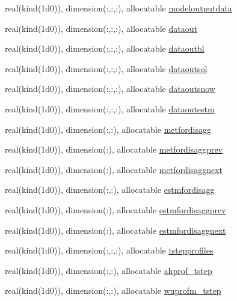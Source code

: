 \begin{DoxyCompactItemize}
\item 
real(kind(1d0)), dimension(\+:,\+:,\+:), allocatable \hyperlink{namespaceallocatearray_a24801c67e9fc5e31774d0495327b964a}{modeloutputdata}
\item 
real(kind(1d0)), dimension(\+:,\+:,\+:), allocatable \hyperlink{namespaceallocatearray_ac655e803ebc3ca4bbd2e53835293f4f2}{dataout}
\item 
real(kind(1d0)), dimension(\+:,\+:,\+:), allocatable \hyperlink{namespaceallocatearray_a668365934e66c156613eaf3027add7a4}{dataoutbl}
\item 
real(kind(1d0)), dimension(\+:,\+:,\+:), allocatable \hyperlink{namespaceallocatearray_a54b22af9df4a501bb6faf47c84186071}{dataoutsol}
\item 
real(kind(1d0)), dimension(\+:,\+:,\+:), allocatable \hyperlink{namespaceallocatearray_a7e6a4164edb43537d8e21816ee3e33e9}{dataoutsnow}
\item 
real(kind(1d0)), dimension(\+:,\+:,\+:), allocatable \hyperlink{namespaceallocatearray_a2eb31590a1528d550321d141efaf4c4b}{dataoutestm}
\item 
real(kind(1d0)), dimension(\+:,\+:), allocatable \hyperlink{namespaceallocatearray_ae588d006cad6ab7a599dc52e5b1c1a53}{metfordisagg}
\item 
real(kind(1d0)), dimension(\+:), allocatable \hyperlink{namespaceallocatearray_a6bed79ef5fd9afaa05e43813c8bdee75}{metfordisaggprev}
\item 
real(kind(1d0)), dimension(\+:), allocatable \hyperlink{namespaceallocatearray_a4b44069fec13b7332a28f5fc6958a273}{metfordisaggnext}
\item 
real(kind(1d0)), dimension(\+:,\+:), allocatable \hyperlink{namespaceallocatearray_a04e38e0bbfe4006aeadc08af89caa7be}{estmfordisagg}
\item 
real(kind(1d0)), dimension(\+:), allocatable \hyperlink{namespaceallocatearray_a394a7e4ca5cd90520c9f11e395eaa1c5}{estmfordisaggprev}
\item 
real(kind(1d0)), dimension(\+:), allocatable \hyperlink{namespaceallocatearray_ab6944a9a020ecb9ba0d067278abfcf85}{estmfordisaggnext}
\item 
real(kind(1d0)), dimension(\+:,\+:,\+:), allocatable \hyperlink{namespaceallocatearray_a55a6f7a4814f569e03bd6f5fd947f6b2}{tstepprofiles}
\item 
real(kind(1d0)), dimension(\+:,\+:), allocatable \hyperlink{namespaceallocatearray_af89bfe5fa1931abd777949bfe250cbd8}{ahprof\+\_\+tstep}
\item 
real(kind(1d0)), dimension(\+:,\+:), allocatable \hyperlink{namespaceallocatearray_adb237729df78f011f8ea814ee43f1703}{wuprofm\+\_\+tstep}

\end{DoxyCompactItemize}
